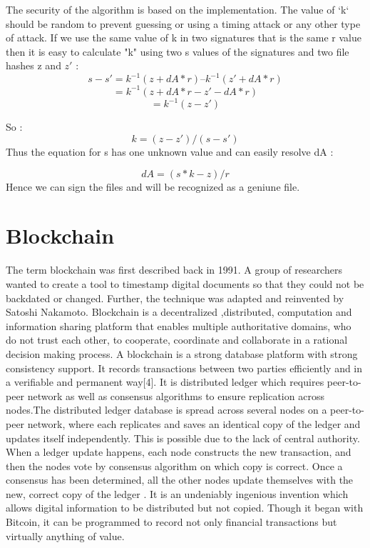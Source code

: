 \documentclass{report}
\begin{document}
The security of the algorithm is based on the implementation. The value of ‘k‘ should be random to prevent guessing or using a timing attack or any other type of attack.
If we use the same value of k in two signatures that is the same r value then it is easy to calculate "k" using two s values of the signatures and two file hashes z and $z'$ :
 $$s- s' = k^{-1} (z + dA*r) – k^{-1} (z' + dA*r) $$
          $$= k^{-1} (z + dA*r - z'- dA*r)$$
          $$= k^{-1} (z - z')$$

So :$$ k = (z - z') / (s - s')$$
Thus the equation for s has one unknown value and can easily resolve dA :

$$dA = (s*k - z) / r$$
 Hence we can sign the files and will be recognized as a geniune file. 




\chapter{Blockchain}
The term blockchain was first described back in 1991. A group of researchers wanted to create a tool to timestamp digital documents so that they could not be backdated or changed. Further, the technique was adapted and reinvented by Satoshi Nakamoto.
Blockchain is a decentralized ,distributed, computation and information sharing platform that enables multiple authoritative domains, who do not trust each other, to cooperate, coordinate and collaborate in a rational decision making process. A blockchain is a strong database platform with strong consistency support. It records transactions between two parties efficiently and in a verifiable and permanent way[4]. It is distributed ledger which requires peer-to-peer network as well as consensus algorithms to ensure replication across nodes.The distributed ledger database is spread across several nodes on a peer-to-peer network, where each replicates and saves an identical copy of the ledger and updates itself independently. This is possible due to the lack of central authority.\cite{yinew} When a ledger update happens, each node constructs the new transaction, and then the nodes vote by consensus algorithm on which copy is correct. Once a consensus has been determined, all the other nodes update themselves with the new, correct copy of the ledger \cite{popper2016venture}\cite{brito2013bitcoin}. It is an undeniably ingenious invention which allows digital information to be distributed but not copied. Though it began with Bitcoin, it can be programmed to record not only financial transactions but virtually anything of value.\\
\end{document}
